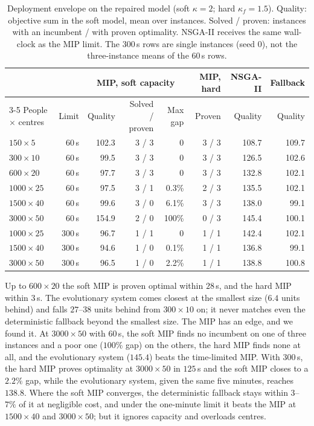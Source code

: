 \documentclass[systems,article,submit,moreauthors,pdftex]{Definitions/mdpi}
\begin{document}
\begin{table}[H]
\centering
\caption{Deployment envelope on the repaired model (soft $\kappa=2$; hard $\kappa_f=1.5$).
Quality: objective sum in the soft model, mean over instances. Solved / proven: instances
with an incumbent / with proven optimality. NSGA-II receives the same wall-clock as the MIP
limit. The 300\,s rows are single instances (seed 0), not the three-instance means of
the 60\,s rows.\label{tab:envelope}}
\small
\begin{tabular}{lrrrrrrr}
\toprule
& & \multicolumn{3}{c}{MIP, soft capacity} & MIP, hard & NSGA-II & Fallback\\
\cmidrule(lr){3-5}
People $\times$ centres & Limit & Quality & Solved / proven & Max gap & Proven & Quality & Quality\\
\midrule
$150 \times 5$ & 60\,s & 102.3 & 3 / 3 & 0 & 3 / 3 & 108.7 & 109.7\\
$300 \times 10$ & 60\,s & 99.5 & 3 / 3 & 0 & 3 / 3 & 126.5 & 102.6\\
$600 \times 20$ & 60\,s & 97.7 & 3 / 3 & 0 & 3 / 3 & 132.8 & 102.1\\
$1000 \times 25$ & 60\,s & 97.5 & 3 / 1 & 0.3\% & 2 / 3 & 135.5 & 102.1\\
$1500 \times 40$ & 60\,s & 99.6 & 3 / 0 & 6.1\% & 3 / 3 & 138.0 & 99.1\\
$3000 \times 50$ & 60\,s & 154.9 & 2 / 0 & 100\% & 0 / 3 & 145.4 & 100.1\\
\midrule
$1000 \times 25$ & 300\,s & 96.7 & 1 / 1 & 0 & 1 / 1 & 142.4 & 102.1\\
$1500 \times 40$ & 300\,s & 94.6 & 1 / 0 & 0.1\% & 1 / 1 & 136.8 & 99.1\\
$3000 \times 50$ & 300\,s & 96.5 & 1 / 0 & 2.2\% & 1 / 1 & 138.8 & 100.8\\
\bottomrule
\end{tabular}
\end{table}

Up to $600\times20$ the soft MIP is proven optimal within $28$\,s, and the hard MIP within
$3$\,s. The evolutionary system comes closest at the smallest size ($6.4$ units behind) and
falls $27$--$38$ units behind from $300\times10$ on; it never matches even the deterministic
fallback beyond the smallest size. The MIP has an edge, and we found it. At $3000\times50$
with $60$\,s, the soft MIP finds no incumbent on one of three instances and a poor one
($100\%$ gap) on the others, the hard MIP finds none at all, and the evolutionary system
($145.4$) beats the time-limited MIP. With $300$\,s, the hard MIP proves optimality at
$3000\times50$ in $125$\,s and the soft MIP closes to a $2.2\%$ gap, while the evolutionary
system, given the same five minutes, reaches $138.8$. Where the soft MIP converges, the deterministic
fallback stays within $3$--$7\%$ of it at negligible cost, and under the one-minute limit it
beats the MIP at $1500\times40$ and $3000\times50$; but it ignores capacity and overloads
centres.
\end{document}

